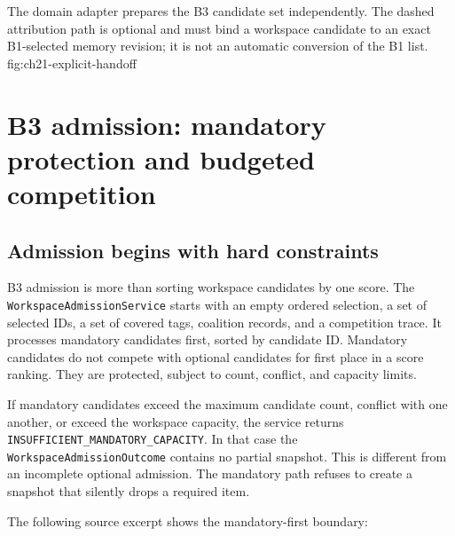   {The domain adapter prepares the B3 candidate set independently. The dashed attribution path is optional and must bind a workspace candidate to an exact B1-selected memory revision; it is not an automatic conversion of the B1 list.}
  {fig:ch21-explicit-handoff}

\section{B3 admission: mandatory protection and budgeted competition}
\label{sec:ch21-b3-admission}

\subsection{Admission begins with hard constraints}
\label{subsec:ch21-b3-mandatory}

B3 admission is more than sorting workspace candidates by one score. The \texttt{Workspace\allowbreak{}Admission\allowbreak{}Service} starts with an empty ordered selection, a set of selected IDs, a set of covered tags, coalition records, and a competition trace. It processes mandatory candidates first, sorted by candidate ID. Mandatory candidates do not compete with optional candidates for first place in a score ranking. They are protected, subject to count, conflict, and capacity limits.

If mandatory candidates exceed the maximum candidate count, conflict with one another, or exceed the workspace capacity, the service returns \texttt{INSUFFICIENT\_\allowbreak{}MANDATORY\_\allowbreak{}CAPACITY}. In that case the \texttt{Workspace\allowbreak{}Admission\allowbreak{}Outcome} contains no partial snapshot. This is different from an incomplete optional admission. The mandatory path refuses to create a snapshot that silently drops a required item.

The following source excerpt shows the mandatory-first boundary:

